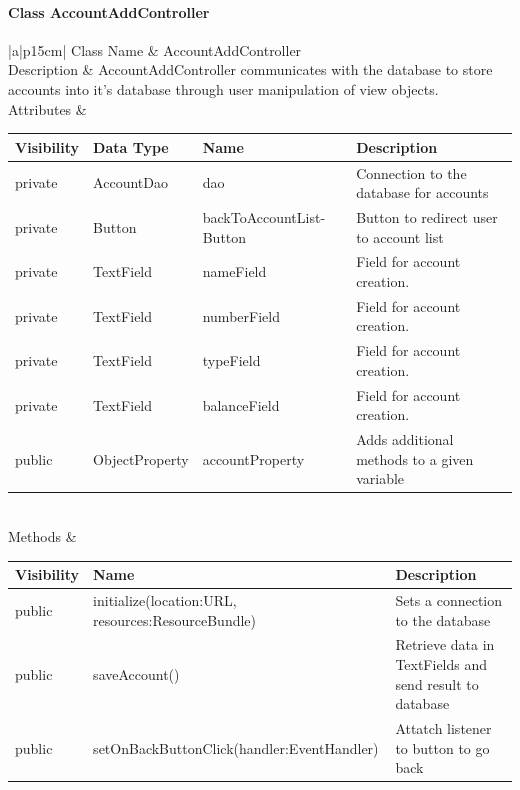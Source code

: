 \documentclass[12pt]{article}
\begin{document}
\paragraph{Class AccountAddController}
\begin{table}[H]
	\begin{tabular}{|a|p{15cm}|}
		\hline
		{Class Name} & {AccountAddController} \\
		\hline
		Description & AccountAddController communicates with the database to store accounts into it's database through user manipulation of view objects.\\
		\hline
		Attributes & 
		\begin{tabular}{| p{2cm} | p{3.0cm} | p{4.0cm} | p{4.45cm} |}
			\hline
			\rowcolor{lightgray}
			Visibility & Data Type & Name & Description \\
			\hline
			\rowcolor{white}
			private & AccountDao & dao & Connection to the database for accounts \\
			\hline
			private & Button & backToAccountList- Button & Button to redirect user to account list \\
			\hline
			private & TextField & nameField & Field for account creation. \\
			\hline
			private & TextField & numberField & Field for account creation. \\
			\hline
			private & TextField & typeField & Field for account creation. \\
			\hline
			private & TextField & balanceField & Field for account creation. \\
			\hline
			public & ObjectProperty & accountProperty & Adds additional methods to a given variable \\
			\hline
		\end{tabular} \\
		\hline
		Methods & 		 
		\begin{tabular}{| p{2cm} | p{5cm} | p{6.9cm} |}
			\hline
			\rowcolor{gray}
			{Visibility} &{Name} & {Description} \\
			\hline
			\rowcolor{white}			
			public &  initialize(location:URL, resources:ResourceBundle) & Sets a connection to the database\\
			\hline
			public &  saveAccount() & Retrieve data in TextFields and send result to database\\
			\hline
			public &  setOnBackButtonClick(handler:EventHandler) & Attatch listener to button to go back\\
			\hline
		\end{tabular}								 
	\end{tabular}
\end{table}
\end{document}
